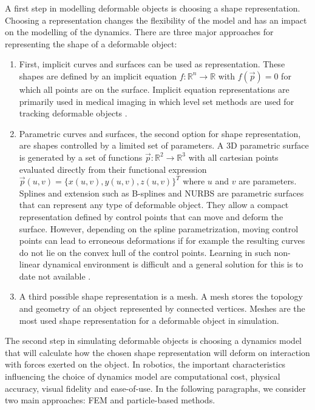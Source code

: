 \documentclass[\home/main.tex]{subfiles}
\begin{document}
A first step in modelling deformable objects is choosing a shape representation. Choosing a representation changes the flexibility of the model and has an impact on the modelling of the dynamics. There are three major approaches for representing the shape of a deformable object:
\begin{enumerate}
	\item First, implicit curves and surfaces can be used as representation. These shapes are defined by an implicit equation $f: \mathbb{R}^{n} \rightarrow \mathbb{R}$ with $f(\vec{p}) = 0$ for which all points are on the surface. Implicit equation representations are primarily used in medical imaging in which level set methods are used for tracking deformable objects \autocite{Cremers2006}. 
	\item Parametric curves and surfaces, the second option for shape representation, are shapes controlled by a limited set of parameters. A 3D parametric surface is generated by a set of functions $\vec{p}: \mathbb{R}^{2} \rightarrow \mathbb{R}^{3}$ with all cartesian points evaluated directly from their functional expression\\$\vec{p}(u, v) = \{x(u, v), y(u, v), z(u, v)\}^{T}$ where $u$ and $v$ are parameters. Splines and extension such as B-splines and NURBS are parametric surfaces that can represent any type of deformable object. They allow a compact representation defined by control points that can move and deform the surface. However, depending on the spline parametrization, moving control points can lead to erroneous deformations if for example the resulting curves do not lie on the convex hull of the control points. Learning in such non-linear dynamical environment is difficult and a general solution for this is to date not available \autocite{rios2020}.
	\item A third possible shape representation is a mesh. A mesh stores the topology and geometry of an object represented by connected vertices. Meshes are the most used shape representation for a deformable object in simulation.
\end{enumerate}

The second step in simulating deformable objects is choosing a dynamics model that will calculate how the chosen shape representation will deform on interaction with forces exerted on the object. In robotics, the important characteristics influencing the choice of dynamics model are computational cost, physical accuracy, visual fidelity and ease-of-use. In the following paragraphs, we consider two main approaches: \gls{FEM} and particle-based methods.
\end{document}
